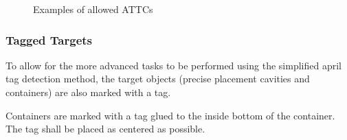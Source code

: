 \begin{figure}[h!]
	\begin{center}
		 \hfill
		 \hfill
		 \hfill
	\end{center}
	\caption{Examples of allowed ATTCs}
	\label{fig:real ATTCs}
\end{figure}



\subsubsection{Tagged Targets}

To allow for the more advanced tasks to be performed using the simplified april tag detection method, the target objects (precise placement cavities and containers) are also marked with a tag.

Containers are marked with a tag glued to the inside bottom of the container. The tag shall be placed as centered as possible.

